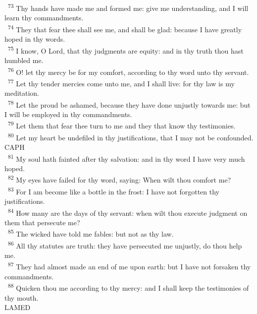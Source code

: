 \documentclass[a5paper,12pt]{article}
\begin{document}
\begin{multicols*}{2}
~\textsuperscript{73} Thy hands have made me and formed me: give me understanding, and I will learn thy commandments.\\
~\textsuperscript{74} They that fear thee shall see me, and shall be glad: because I have greatly hoped in thy words.\\
~\textsuperscript{75} I know, O Lord, that thy judgments are equity: and in thy truth thou hast humbled me.\\
~\textsuperscript{76} O! let thy mercy be for my comfort, according to thy word unto thy servant.\\
~\textsuperscript{77} Let thy tender mercies come unto me, and I shall live: for thy law is my meditation.\\
~\textsuperscript{78} Let the proud be ashamed, because they have done unjustly towards me: but I will be employed in thy commandments.\\
~\textsuperscript{79} Let them that fear thee turn to me and they that know thy testimonies.\\
~\textsuperscript{80} Let my heart be undefiled in thy justifications, that I may not be confounded.\\

CAPH\\

~\textsuperscript{81} My soul hath fainted after thy salvation: and in thy word I have very much hoped.\\
~\textsuperscript{82} My eyes have failed for thy word, saying: When wilt thou comfort me?\\
~\textsuperscript{83} For I am become like a bottle in the frost: I have not forgotten thy justifications.\\
~\textsuperscript{84} How many are the days of thy servant: when wilt thou execute judgment on them that persecute me?\\
~\textsuperscript{85} The wicked have told me fables: but not as thy law.\\
~\textsuperscript{86} All thy statutes are truth: they have persecuted me unjustly, do thou help me.\\
~\textsuperscript{87} They had almost made an end of me upon earth: but I have not forsaken thy commandments.\\
~\textsuperscript{88} Quicken thou me according to thy mercy: and I shall keep the testimonies of thy mouth.\\

LAMED\\


\end{multicols*}
\end{document}

